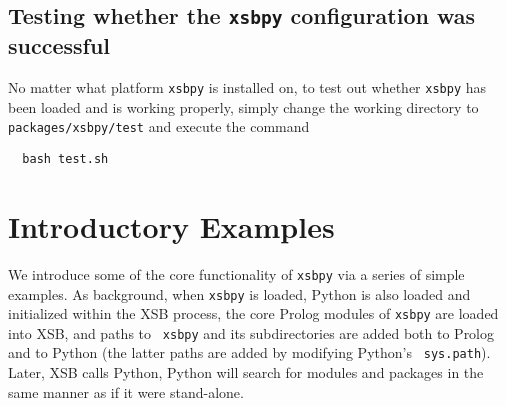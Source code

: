 \subsection{Testing whether the {\tt xsbpy} configuration was successful}

No matter what platform {\tt xsbpy} is installed on, to test out
whether {\tt xsbpy} has been loaded and is working properly, simply
change the working directory to {\tt packages/xsbpy/test} and execute the
command

\begin{verbatim}
  bash test.sh
\end{verbatim}


\section{Introductory Examples}

We introduce some of the core functionality of {\tt xsbpy} via a
series of simple examples.  As background, when {\tt xsbpy} is loaded,
Python is also loaded and initialized within the XSB process, the core
Prolog modules of {\tt xsbpy} are loaded into XSB, and paths to {\tt
  xsbpy} and its subdirectories are added both to Prolog and to Python
(the latter paths are added by modifying Python's {\tt
  sys.path}). Later, XSB calls Python, Python will search for modules
and packages in the same manner as if it were stand-alone.

